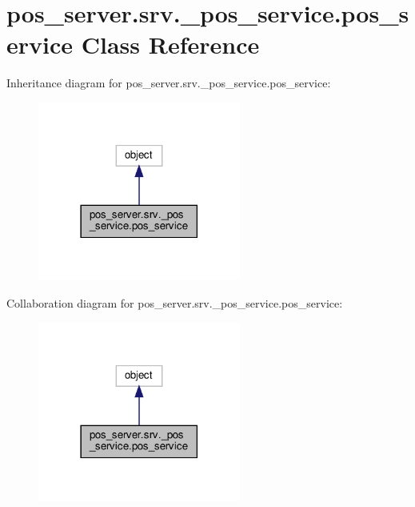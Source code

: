 \hypertarget{classpos__server_1_1srv_1_1__pos__service_1_1pos__service}{}\section{pos\+\_\+server.\+srv.\+\_\+pos\+\_\+service.\+pos\+\_\+service Class Reference}
\label{classpos__server_1_1srv_1_1__pos__service_1_1pos__service}


Inheritance diagram for pos\+\_\+server.\+srv.\+\_\+pos\+\_\+service.\+pos\+\_\+service\+:
\nopagebreak
\begin{figure}[H]
\begin{center}
\leavevmode
\includegraphics[width=189pt]{classpos__server_1_1srv_1_1__pos__service_1_1pos__service__inherit__graph}
\end{center}
\end{figure}


Collaboration diagram for pos\+\_\+server.\+srv.\+\_\+pos\+\_\+service.\+pos\+\_\+service\+:
\nopagebreak
\begin{figure}[H]
\begin{center}
\leavevmode
\includegraphics[width=189pt]{classpos__server_1_1srv_1_1__pos__service_1_1pos__service__coll__graph}
\end{center}
\end{figure}


